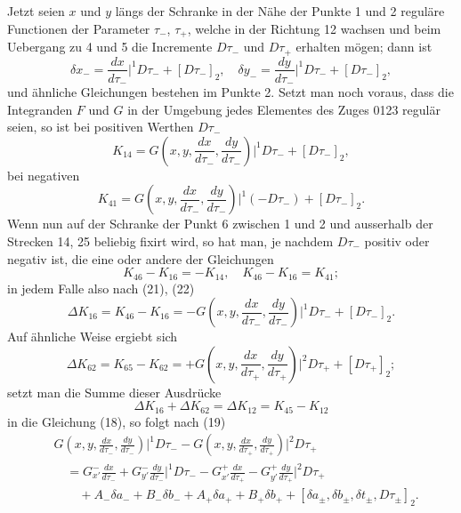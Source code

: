 \documentclass[11pt,a4paper,leqno]{article}
\begin{document}
Jetzt seien $x$ und $y$ längs der Schranke in der Nähe der Punkte 1 und 2 reguläre Functionen der Parameter $\tau_-$, $\tau_+$, welche in der Richtung 12 wachsen und beim Uebergang zu 4 und 5 die Incremente $D\tau_-$ und $D\tau_+$ erhalten mögen; dann ist
\[
\delta x_- =\frac{dx}{d\tau_-}\bigg|^1D\tau_-+[D\tau_-]_2,
\quad
\delta y_- =\frac{dy}{d\tau_-}\bigg|^1D\tau_-+[D\tau_-]_2,
\]
und ähnliche Gleichungen bestehen im Punkte 2. Setzt man noch voraus, dass die Integranden $F$ und $G$ in der Umgebung jedes Elementes des Zuges 0123 regulär seien, so ist bei positiven Werthen $D\tau_-$
\begin{equation}\tag{21}
K_{14}=G\left(x,y,\frac{dx}{d\tau_-},\frac{dy}{d\tau_-}\right)\bigg|^1D\tau_-+[D\tau_-]_2,
\end{equation}
bei negativen
\begin{equation}\tag{22}
K_{41}=G\left(x,y,\frac{dx}{d\tau_-},\frac{dy}{d\tau_-}\right)\bigg|^1(-D\tau_-)+[D\tau_-]_2.
\end{equation}
Wenn nun auf der Schranke der Punkt 6 zwischen 1 und 2 und ausserhalb der Strecken 14, 25 beliebig fixirt wird, so hat man, je nachdem $D\tau_-$ positiv oder negativ ist, die eine oder andere der Gleichungen
\[
K_{46}-K_{16}=-K_{14},
\quad
K_{46}-K_{16}=K_{41};
\]
in jedem Falle also nach (21), (22)
\begin{equation}\tag{23}
\Delta K_{16}=K_{46}-K_{16}
=-G\left(x,y,\frac{dx}{d\tau_-},\frac{dy}{d\tau_-}\right)\bigg|^1D\tau_-+[D\tau_-]_2.
\end{equation}
Auf ähnliche Weise ergiebt sich
\begin{equation}\tag{24}
\Delta K_{62}=K_{65}-K_{62}
=+G\left(x,y,\frac{dx}{d\tau_+},\frac{dy}{d\tau_+}\right)\bigg|^2D\tau_+ +[D\tau_+]_2;
\end{equation}
setzt man die Summe dieser Ausdrücke
\[
\Delta K_{16}+\Delta K_{62}=\Delta K_{12}=K_{45}-K_{12}
\]
in die Gleichung (18), so folgt nach (19)
\begin{equation}\tag{25}
\begin{aligned}
&G\left(x,y,\frac{dx}{d\tau_-},\frac{dy}{d\tau_-}\right)\bigg|^1D\tau_-
-G\left(x,y,\frac{dx}{d\tau_+},\frac{dy}{d\tau_+}\right)\bigg|^2D\tau_+\\
&\quad=G_{x'}^-\frac{dx}{d\tau_-}+G_{y'}^-\frac{dy}{d\tau_-}\bigg|^1D\tau_-
-G_{x'}^+\frac{dx}{d\tau_+}-G_{y'}^+\frac{dy}{d\tau_+}\bigg|^2D\tau_+\\
&\qquad +A_-\delta a_-+B_-\delta b_-+A_+\delta a_+ +B_+\delta b_+
+[\delta a_\pm,\delta b_\pm,\delta t_\pm,D\tau_\pm]_2.
\end{aligned}
\end{equation}
\end{document}
